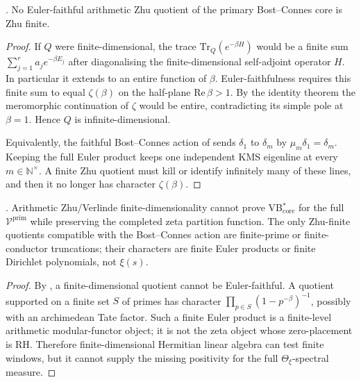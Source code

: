 \begin{theorem}
\label{v4-arith:vb:thm:no-euler-faithful-zhu-finite}
\ClaimStatusProvedHere. No Euler-faithful arithmetic Zhu quotient of
the primary Bost--Connes core is Zhu finite.
\end{theorem}

\begin{proof}
If \(Q\) were finite-dimensional, the trace
\(\mathrm{Tr}_{Q}(e^{-\beta H})\) would be a finite sum
\(\sum_{j=1}^{r}a_{j}e^{-\beta E_{j}}\) after diagonalising the
finite-dimensional self-adjoint operator \(H\). In particular it extends to an
entire function of \(\beta\). Euler-faithfulness requires this finite
sum to equal \(\zeta(\beta)\) on the half-plane
\(\mathrm{Re}\,\beta>1\). By the identity theorem the meromorphic
continuation of \(\zeta\) would be entire, contradicting its simple
pole at \(\beta=1\). Hence \(Q\) is infinite-dimensional.

Equivalently, the faithful Bost--Connes action of
 sends
\(\delta_{1}\) to \(\delta_{m}\) by \(\mu_{m}\delta_{1}=\delta_{m}\).
Keeping the full Euler product keeps one independent KMS eigenline at
every \(m\in\mathbb{N}^{\times}\). A finite Zhu quotient must kill or
identify infinitely many of these lines, and then it no longer has
character \(\zeta(\beta)\).
\end{proof}

\begin{corollary}
\label{v4-arith:vb:cor:verlinde-shortcut-fails}
\ClaimStatusProvedHere. Arithmetic Zhu/Verlinde finite-dimensionality
cannot prove VB\(^{*}_{\mathrm{core}}\) for the full
\(\mathcal{V}^{\mathrm{prim}}\) while preserving the completed zeta
partition function. The only Zhu-finite quotients compatible with the
Bost--Connes action are finite-prime or finite-conductor truncations;
their characters are finite Euler products or finite Dirichlet
polynomials, not \(\xi(s)\).
\end{corollary}

\begin{proof}
By , a
finite-dimensional quotient cannot be Euler-faithful. A quotient
supported on a finite set \(S\) of primes has character
\(\prod_{p\in S}(1-p^{-\beta})^{-1}\), possibly with an archimedean
Tate factor. Such a finite Euler product is a finite-level arithmetic
modular-functor object; it is not the zeta object whose zero-placement
is RH. Therefore finite-dimensional Hermitian linear algebra can test
finite windows, but it cannot supply the missing positivity for the
full \(\Theta_{\xi}\)-spectral measure.
\end{proof}

